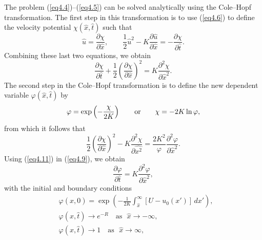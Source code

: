 \documentclass[10pt]{article}
\begin{document}
     The problem (\ref{eq4.4})--(\ref{eq4.5}) can be solved analytically
using the Cole--Hopf transformation.  The first step in this transformation
is to use (\ref{eq4.6}) to define the velocity potential $\chi(\hat{x},\hat{t})$
such that
\begin{equation}                                 %
       \hat{u} = \frac{\partial\chi}{\partial\hat{x}},   \qquad
     \frac{1}{2}\hat{u}^2 - K\frac{\partial\hat{u}}{\partial\hat{x}}
                    = -\frac{\partial\chi}{\partial\hat{t}}.
\label{eq4.8}
\end{equation}
Combining these last two equations, we obtain
\begin{equation}                                 %
                         \frac{\partial\chi}{\partial\hat{t}}
     +  \frac{1}{2}\left(\frac{\partial\chi}{\partial\hat{x}}\right)^2
     = K\frac{\partial^2\chi}{\partial\hat{x}^2}.
\label{eq4.9}
\end{equation}
The second step in the Cole--Hopf transformation is to define the new dependent
variable $\varphi(\hat{x},\hat{t})$ by
\begin{equation}                                 %
            \varphi = \exp\left(-\frac{\chi}{2K}\right)
                                 \qquad {\rm or}  \qquad
               \chi = -2K \ln\varphi,
\label{eq4.10}
\end{equation}
from which it follows that
\begin{equation}                                 %
         \frac{1}{2}\left(\frac{\partial\chi}{\partial \hat{x}}\right)^2
     - K \frac{\partial^2\chi}{\partial\hat{x^2}}
     = \frac{2K^2}{\varphi} \frac{\partial^2\varphi}{\partial\hat{x}^2}.
\label{eq4.11}
\end{equation}
Using (\ref{eq4.11}) in (\ref{eq4.9}), we obtain
\begin{equation}                                 %
        \frac{\partial\varphi}{\partial\hat{t}}
     = K\frac{\partial^2\varphi}{\partial\hat{x}^2},
\label{eq4.12}
\end{equation}
with the initial and boundary conditions
\begin{equation}                                 %
  \begin{split}
    &\varphi(\hat{x},0) = \exp\left(-\frac{1}{2K}\int_{\hat{x}}^\infty [U-u_0(x')]\, dx'\right), \\
    &\varphi(\hat{x},\hat{t}) \to e^{-R} \quad \text{as}\,\,\,\, \hat{x} \to -\infty,  \\
    &\varphi(\hat{x},\hat{t}) \to 1      \quad \text{as}\,\,\,\, \hat{x} \to  \infty,
  \end{split}
\label{eq4.13}
\end{equation}
\end{document}

